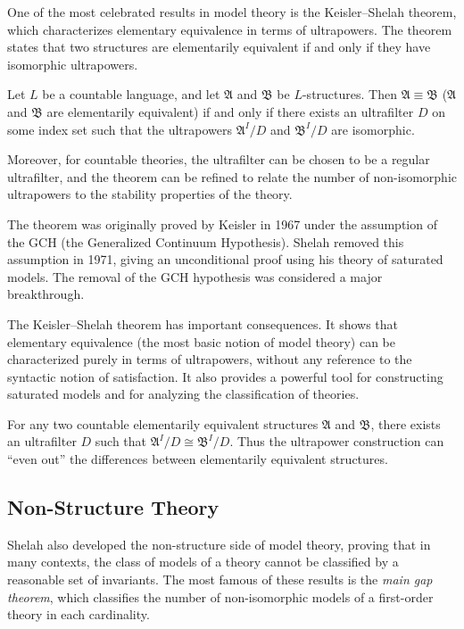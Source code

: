 One of the most celebrated results in model theory is the Keisler--Shelah theorem, which characterizes elementary equivalence in terms of ultrapowers. The theorem states that two structures are elementarily equivalent if and only if they have isomorphic ultrapowers.

\begin{theorem}
Let \(L\) be a countable language, and let \(\mathfrak{A}\) and \(\mathfrak{B}\) be \(L\)-structures. Then \(\mathfrak{A} \equiv \mathfrak{B}\) (\(\mathfrak{A}\) and \(\mathfrak{B}\) are elementarily equivalent) if and only if there exists an ultrafilter \(D\) on some index set such that the ultrapowers \(\mathfrak{A}^I / D\) and \(\mathfrak{B}^I / D\) are isomorphic.

Moreover, for countable theories, the ultrafilter can be chosen to be a regular ultrafilter, and the theorem can be refined to relate the number of non-isomorphic ultrapowers to the stability properties of the theory.
\end{theorem}

The theorem was originally proved by Keisler in 1967 under the assumption of the GCH (the Generalized Continuum Hypothesis). Shelah removed this assumption in 1971, giving an unconditional proof using his theory of saturated models. The removal of the GCH hypothesis was considered a major breakthrough.

The Keisler--Shelah theorem has important consequences. It shows that elementary equivalence (the most basic notion of model theory) can be characterized purely in terms of ultrapowers, without any reference to the syntactic notion of satisfaction. It also provides a powerful tool for constructing saturated models and for analyzing the classification of theories.

\begin{corollary}
For any two countable elementarily equivalent structures \(\mathfrak{A}\) and \(\mathfrak{B}\), there exists an ultrafilter \(D\) such that \(\mathfrak{A}^{I}/D \cong \mathfrak{B}^{I}/D\). Thus the ultrapower construction can ``even out'' the differences between elementarily equivalent structures.
\end{corollary}

\subsection{Non-Structure Theory}

Shelah also developed the non-structure side of model theory, proving that in many contexts, the class of models of a theory cannot be classified by a reasonable set of invariants. The most famous of these results is the \emph{main gap theorem}, which classifies the number of non-isomorphic models of a first-order theory in each cardinality.

